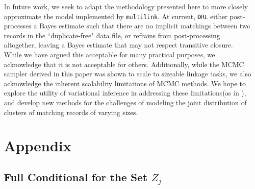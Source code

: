 \documentclass[12pt,letterpaper]{article}
\newcommand{\1}[1]{\mathbb{I}\!\left[#1\right]} %
\begin{document}
In future work, we seek to adapt the methodology presented here to more closely approximate the model implemented by \texttt{multilink}. At current, \texttt{DRL} either post-processes a Bayes estimate such that there are no implicit matchings between two records in the ``duplicate-free" data file, or refrains from post-processing altogether, leaving a Bayes estimate that may not respect transitive closure. While we have argued this acceptable for many practical purposes, we acknowledge that it is not acceptable for others. Additionally, while the MCMC sampler derived in this paper was shown to scale to sizeable linkage tasks, we also acknowledge the inherent scalability limitations of MCMC methods. We hope to explore the utility of variational inference in addressing these limitations(as in \cite{kundinger_2024_vabl}), and develop new methods for the challenges of modeling the joint distribution of clusters of matching records of varying sizes. 

\pagebreak



\pagebreak

\section{Appendix}
\label{sec:appendix}

\subsection{Full Conditional for the Set $Z_j$}\label{app:joint-distribution}
\end{document}
